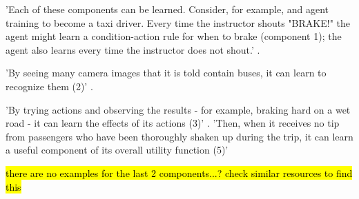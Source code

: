 'Each of these components can be learned. Consider, for example, and agent training to become a taxi driver. Every time the instructor shouts "BRAKE!" the agent might learn a condition-action rule for when to brake (component 1); the agent also learns every time the instructor does not shout.' \cite{russell2016artificial}.

'By seeing many camera images that it is told contain buses, it can learn to recognize them (2)' \cite{russell2016artificial}.

'By trying actions and observing the results - for example, braking hard on a wet road - it can learn the effects of its actions (3)' \cite{russell2016artificial}.
'Then, when it receives no tip from passengers who have been thoroughly shaken up during the trip, it can learn a useful component of its overall utility function (5)' \cite{russell2016artificial}

\hl{there are no examples for the last 2 components...? check similar resources to find this}




